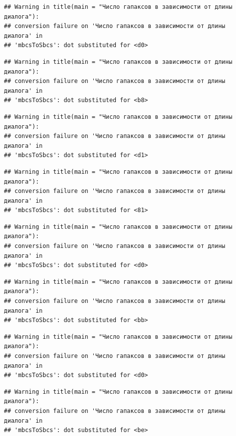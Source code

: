 \documentclass[
]{book}
\theoremstyle{definition}
\theoremstyle{definition}
\theoremstyle{definition}
\theoremstyle{definition}
\theoremstyle{remark}
\begin{document}
\begin{verbatim}
## Warning in title(main = "Число гапаксов в зависимости от длины диалога"):
## conversion failure on 'Число гапаксов в зависимости от длины диалога' in
## 'mbcsToSbcs': dot substituted for <d0>
\end{verbatim}

\begin{verbatim}
## Warning in title(main = "Число гапаксов в зависимости от длины диалога"):
## conversion failure on 'Число гапаксов в зависимости от длины диалога' in
## 'mbcsToSbcs': dot substituted for <b8>
\end{verbatim}

\begin{verbatim}
## Warning in title(main = "Число гапаксов в зависимости от длины диалога"):
## conversion failure on 'Число гапаксов в зависимости от длины диалога' in
## 'mbcsToSbcs': dot substituted for <d1>
\end{verbatim}

\begin{verbatim}
## Warning in title(main = "Число гапаксов в зависимости от длины диалога"):
## conversion failure on 'Число гапаксов в зависимости от длины диалога' in
## 'mbcsToSbcs': dot substituted for <81>
\end{verbatim}

\begin{verbatim}
## Warning in title(main = "Число гапаксов в зависимости от длины диалога"):
## conversion failure on 'Число гапаксов в зависимости от длины диалога' in
## 'mbcsToSbcs': dot substituted for <d0>
\end{verbatim}

\begin{verbatim}
## Warning in title(main = "Число гапаксов в зависимости от длины диалога"):
## conversion failure on 'Число гапаксов в зависимости от длины диалога' in
## 'mbcsToSbcs': dot substituted for <bb>
\end{verbatim}

\begin{verbatim}
## Warning in title(main = "Число гапаксов в зависимости от длины диалога"):
## conversion failure on 'Число гапаксов в зависимости от длины диалога' in
## 'mbcsToSbcs': dot substituted for <d0>
\end{verbatim}

\begin{verbatim}
## Warning in title(main = "Число гапаксов в зависимости от длины диалога"):
## conversion failure on 'Число гапаксов в зависимости от длины диалога' in
## 'mbcsToSbcs': dot substituted for <be>
\end{verbatim}
\end{document}

